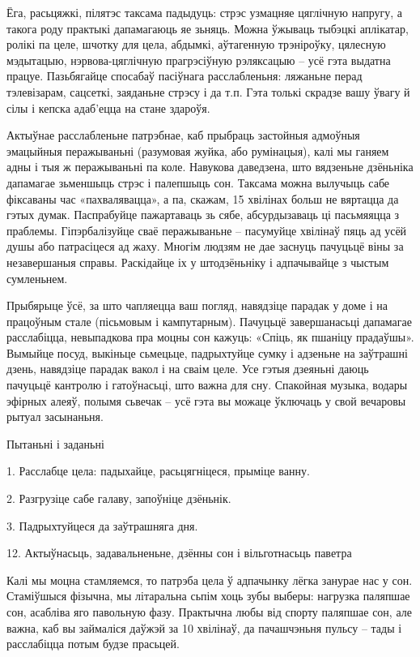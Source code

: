 Ёга, расьцяжкі, пілятэс таксама падыдуць: стрэс узмацняе цяглічную напругу, а такога роду практыкі дапамагаюць яе зьняць. Можна ўжываць тыбэцкі аплікатар, ролікі па целе, шчотку для цела, абдымкі, аўтагенную трэніроўку, цялесную мэдытацыю, нэрвова-цяглічную прагрэсіўную рэляксацыю – усё гэта выдатна працуе. Пазьбягайце спосабаў пасіўнага расслабленьня: ляжаньне перад тэлевізарам, сацсеткі, заяданьне стрэсу і да т.п. Гэта толькі скрадзе вашу ўвагу й сілы і кепска адаб'ецца на стане здароўя.

Актыўнае расслабленьне патрэбнае, каб прыбраць застойныя адмоўныя эмацыйныя перажываньні (разумовая жуйка, або румінацыя), калі мы ганяем адны і тыя ж перажываньні па коле. Навукова даведзена, што вядзеньне дзёньніка дапамагае зьменшыць стрэс і палепшыць сон. Таксама можна вылучыць сабе фіксаваны час «пахвалявацца», а па, скажам, 15 хвілінах больш не вяртацца да гэтых думак. Паспрабуйце пажартаваць зь сябе, абсурдызаваць ці пасьмяяцца з праблемы. Гіпэрбалізуйце сваё перажываньне – пасумуйце хвілінаў пяць ад усёй душы або патрасіцеся ад жаху. Многім людзям не дае заснуць пачуцьцё віны за незавершаныя справы. Раскідайце іх у штодзёньніку і адпачывайце з чыстым сумленьнем.

Прыбярыце ўсё, за што чапляецца ваш погляд, навядзіце парадак у доме і на працоўным стале (пісьмовым і кампутарным). Пачуцьцё завершанасьці дапамагае расслабіцца, невыпадкова пра моцны сон кажуць: «Спіць, як пшаніцу прадаўшы». Вымыйце посуд, выкіньце сьмецьце, падрыхтуйце сумку і адзеньне на заўтрашні дзень, навядзіце парадак вакол і на сваім целе. Усе гэтыя дзеяньні даюць пачуцьцё кантролю і гатоўнасьці, што важна для сну. Спакойная музыка, водары эфірных алеяў, полымя сьвечак – усё гэта вы можаце ўключаць у свой вечаровы рытуал засынаньня.

Пытаньні і заданьні

1. Расслабце цела: падыхайце, расьцягніцеся, прыміце ванну.

2. Разгрузіце сабе галаву, запоўніце дзёньнік.

3. Падрыхтуйцеся да заўтрашняга дня.


12. Актыўнасьць, задавальненьне, дзённы сон і вільготнасьць паветра

Калі мы моцна стамляемся, то патрэба цела ў адпачынку лёгка занурае нас у сон. Стаміўшыся фізычна, мы літаральна сьпім хоць зубы выберы: нагрузка паляпшае сон, асабліва яго павольную фазу. Практычна любы від спорту паляпшае сон, але важна, каб вы займаліся даўжэй за 10 хвілінаў, да пачашчэньня пульсу – тады і расслабіцца потым будзе прасьцей.

